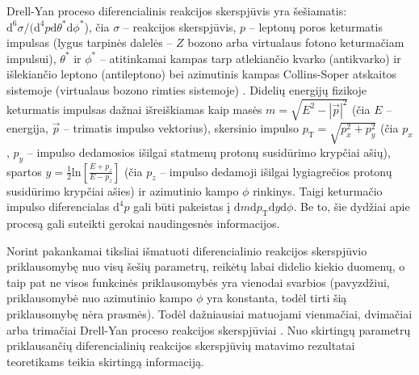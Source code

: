 \documentclass[a4paper, 12pt, oneside]{article}
\newcommand{\pT}{p_{\mathrm{T}}}
\newlength\q
\begin{document}
Drell-Yan proceso diferencialinis reakcijos skerspjūvis yra šešiamatis:
$\mathrm{d}^6\sigma/(\mathrm{d}^4p\mathrm{d}\theta^*\mathrm{d}\phi^*$), čia $\sigma$ -- reakcijos skerspjūvis,
$p$ -- leptonų poros keturmatis impulsas (lygus tarpinės dalelės -- $Z$ bozono arba virtualaus fotono keturmačiam
impulsui), $\theta^*$ ir $\phi^*$ -- atitinkamai kampas tarp atlekiančio kvarko (antikvarko) ir išlekiančio leptono (antileptono)
bei azimutinis kampas Collins-Soper atskaitos sistemoje (virtualaus bozono rimties sistemoje) \cite{DYangular}.
Didelių energijų fizikoje keturmatis impulsas dažnai išreiškiamas kaip masės $m=\sqrt{E^2-|\vec{p}|^2}$ (čia $E$ -- energija,
$\vec{p}$ -- trimatis impulso vektorius), skersinio impulso $\pT=\sqrt{p_x^2+p_y^2}$ (čia $p_x$, $p_y$ -- impulso dedamosios
išilgai statmenų protonų susidūrimo krypčiai ašių), spartos $y=\frac{1}{2}\mathrm{ln}[\frac{E+p_z}{E-p_z}]$ (čia $p_z$ -- impulso dedamoji
išilgai lygiagrečios protonų susidūrimo krypčiai ašies) ir
azimutinio kampo $\phi$ rinkinys.
Taigi keturmačio impulso diferencialas $\mathrm{d}^4p$ gali būti pakeistas į $\mathrm{d}m\mathrm{d}\pT\mathrm{d}y\mathrm{d}\phi$.
Be to, šie dydžiai apie procesą gali suteikti gerokai naudingesnės informacijos.

Norint pakankamai tiksliai išmatuoti diferencialinio reakcijos skerspjūvio priklausomybę nuo visų šešių parametrų,
reikėtų labai didelio kiekio duomenų, o taip pat ne visos funkcinės priklausomybės yra vienodai svarbios (pavyzdžiui,
priklausomybė nuo azimutinio kampo $\phi$ yra konstanta, todėl tirti šią priklausomybę nėra prasmės).
Todėl dažniausiai matuojami vienmačiai, dvimačiai arba trimačiai Drell-Yan proceso reakcijos skerspjūviai
\cite{DY_CMS2011, DY_CMS2013, DY_ATLAS2013, DY_ATLAS2014, DY_CMS2015, DY_ATLAS2016, DY_ATLAS2017, DY_CMS2019}.
Nuo skirtingų parametrų priklausančių diferencialinių reakcijos skerspjūvių matavimo rezultatai teoretikams teikia
skirtingą informaciją.
\end{document}
